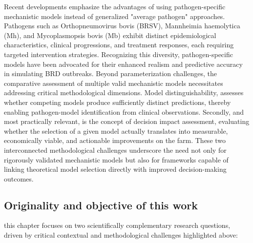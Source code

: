 Recent developments emphasize the advantages of using pathogen-specific mechanistic models instead of generalized "average pathogen" approaches. Pathogens such as Orthopneumovirus bovis (BRSV), Mannheimia haemolytica (Mh), and Mycoplasmopsis bovis (Mb) exhibit distinct epidemiological characteristics, clinical progressions, and treatment responses, each requiring targeted intervention strategies. Recognizing this diversity, pathogen-specific models have been advocated for their enhanced realism and predictive accuracy in simulating BRD outbreaks. Beyond parameterization challenges, the comparative assessment of multiple valid mechanistic models necessitates addressing critical methodological dimensions. Model distinguishability, assesses whether competing models produce sufficiently distinct predictions, thereby enabling pathogen-model identification from clinical observations. Secondly, and most practically relevant, is the concept of decision impact assessment, evaluating whether the selection of a given model actually translates into measurable, economically viable, and actionable improvements on the farm. These two interconnected methodological challenges underscore the need not only for rigorously validated mechanistic models but also for frameworks capable of linking theoretical model selection directly with improved decision-making outcomes.




\subsection{Originality and objective of this work}

this chapter focuses on two scientifically complementary research questions, driven by critical contextual and methodological challenges highlighted above:

